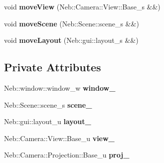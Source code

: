 \begin{DoxyCompactItemize}
\item 
\hypertarget{classNeb_1_1renderable_a58382d2c86f9d70e3315717d0b5d0cfd}{void {\bfseries move\-View} (\-Neb\-::\-Camera\-::\-View\-::\-Base\-\_\-s \&\&)}\label{classNeb_1_1renderable_a58382d2c86f9d70e3315717d0b5d0cfd}

\item 
\hypertarget{classNeb_1_1renderable_a22c9a9e313115bd24976d607d09b75e7}{void {\bfseries move\-Scene} (\-Neb\-::\-Scene\-::scene\-\_\-s \&\&)}\label{classNeb_1_1renderable_a22c9a9e313115bd24976d607d09b75e7}

\item 
\hypertarget{classNeb_1_1renderable_ac43c83e45f5f10eaf6b8ffc2c3a8a3ee}{void {\bfseries move\-Layout} (\-Neb\-::gui\-::layout\-\_\-s \&\&)}\label{classNeb_1_1renderable_ac43c83e45f5f10eaf6b8ffc2c3a8a3ee}

\end{DoxyCompactItemize}
\subsection*{\-Private \-Attributes}
\begin{DoxyCompactItemize}
\item 
\hypertarget{classNeb_1_1renderable_a4f8954124931d93eddf660c98a45cf7d}{\-Neb\-::window\-::window\-\_\-w {\bfseries window\-\_\-}}\label{classNeb_1_1renderable_a4f8954124931d93eddf660c98a45cf7d}

\item 
\hypertarget{classNeb_1_1renderable_a56c97489c92bfa73d8a131efd1c1958d}{\-Neb\-::\-Scene\-::scene\-\_\-s {\bfseries scene\-\_\-}}\label{classNeb_1_1renderable_a56c97489c92bfa73d8a131efd1c1958d}

\item 
\hypertarget{classNeb_1_1renderable_a5e90c1aba3bb47b0071bd79a00975b49}{\-Neb\-::gui\-::layout\-\_\-u {\bfseries layout\-\_\-}}\label{classNeb_1_1renderable_a5e90c1aba3bb47b0071bd79a00975b49}

\item 
\hypertarget{classNeb_1_1renderable_a6585f1507f5afeb152b50fa2a103697a}{\-Neb\-::\-Camera\-::\-View\-::\-Base\-\_\-u {\bfseries view\-\_\-}}\label{classNeb_1_1renderable_a6585f1507f5afeb152b50fa2a103697a}

\item 
\hypertarget{classNeb_1_1renderable_a3178d18be5e839c357afefb42e85f788}{\-Neb\-::\-Camera\-::\-Projection\-::\-Base\-\_\-u {\bfseries proj\-\_\-}}\label{classNeb_1_1renderable_a3178d18be5e839c357afefb42e85f788}

\end{DoxyCompactItemize}


